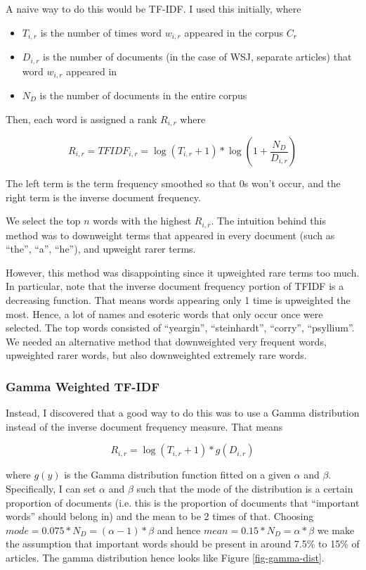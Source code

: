 A naive way to do this would be TF-IDF. I used this initially, where

\begin{itemize}
\item $T_{i, r}$ is the number of times word $w_{i, r}$ appeared in the corpus $C_r$
\item $D_{i, r}$ is the number of documents (in the case of WSJ, separate articles) that word $w_{i, r}$ appeared in
\item $N_D$ is the number of documents in the entire corpus
\end{itemize}

Then, each word is assigned a rank $R_{i, r}$ where

\[R_{i, r} = TFIDF_{i, r} = \log{\left(T_{i, r} + 1\right)} * \log{\left(1 + \frac{N_D}{D_{i, r}}\right)}\]

The left term is the term frequency smoothed so that 0s won't occur, and the right term is the inverse document frequency.

We select the top $n$ words with the highest $R_{i, r}$. The intuition behind this method was to downweight terms that appeared in every document (such as ``the'', ``a'', ``he''), and upweight rarer terms.

However, this method was disappointing since it upweighted rare terms too much. In particular, note that the inverse document frequency portion of TFIDF is a decreasing function. That means words appearing only 1 time is upweighted the most. Hence, a lot of names and esoteric words that only occur once were selected. The top words consisted of ``yeargin'', ``steinhardt'', ``corry'', ``psyllium''. We needed an alternative method that downweighted very frequent words, upweighted rarer words, but also downweighted extremely rare words.

\subsubsection{Gamma Weighted TF-IDF}

Instead, I discovered that a good way to do this was to use a Gamma distribution instead of the inverse document frequency measure. That means 

\[R_{i,r} = \log{\left(T_{i, r} + 1\right)} * g\left(D_{i, r}\right)\]

where $g(y)$ is the Gamma distribution function fitted on a given $\alpha$ and $\beta$. Specifically, I can set $\alpha$ and $\beta$ such that the mode of the distribution is a certain proportion of documents (i.e. this is the proportion of documents that ``important words'' should belong in) and the mean to be 2 times of that. Choosing $mode = 0.075*N_D = (\alpha - 1) * \beta$ and hence $mean = 0.15 * N_D = \alpha * \beta$ we make the assumption that important words should be present in around 7.5\% to 15\% of articles. The gamma distribution hence looks like Figure \ref{fig-gamma-dist}.

